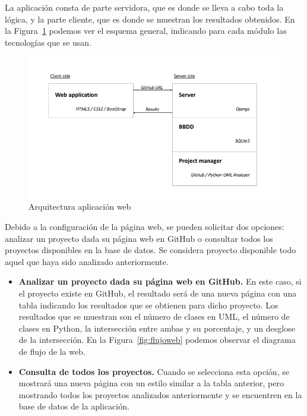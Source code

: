 \documentclass[a4paper, 12pt]{book}
\begin{document}
La aplicación consta de parte servidora, que es donde se lleva a cabo toda la lógica, y
la parte cliente, que es donde se muestran los resultados obtenidos. En la Figura~\ref{fig:arquitectura}
podemos ver el esquema general, indicando para cada módulo las tecnologías que se usan.
\begin{figure}[htb]
  \centering
  \includegraphics[width=12cm, keepaspectratio]{img/arquitectura-web}
  \caption{Arquitectura aplicación web}
  \label{fig:arquitectura}
\end{figure}

Debido a la configuración de la página web, se pueden solicitar dos opciones: analizar un proyecto
dada su página web en GitHub o consultar todos los proyectos disponibles en la base de datos. Se considera proyecto
disponible todo aquel que haya sido analizado anteriormente.


\begin{itemize}
  \item \textbf{Analizar un proyecto dada su página web en GitHub.} En este caso, si el proyecto existe
  en GitHub, el resultado será de una nueva página con una tabla indicando los resultados que se obtienen
  para dicho proyecto. Los resultados que se muestran son el número de clases en UML, el número de clases en Python,
  la intersección entre ambas y su porcentaje, y un desglose de la intersección. En la Figura~\ref{fig:flujoweb} podemos observar el diagrama de flujo de la web.
  \item \textbf{Consulta de todos los proyectos.} Cuando se selecciona esta opción, se mostrará una nueva página
  con un estilo similar a la tabla anterior, pero mostrando todos los proyectos analizados anteriormente y se encuentren
  en la base de datos de la aplicación.
\end{itemize}
\end{document}
